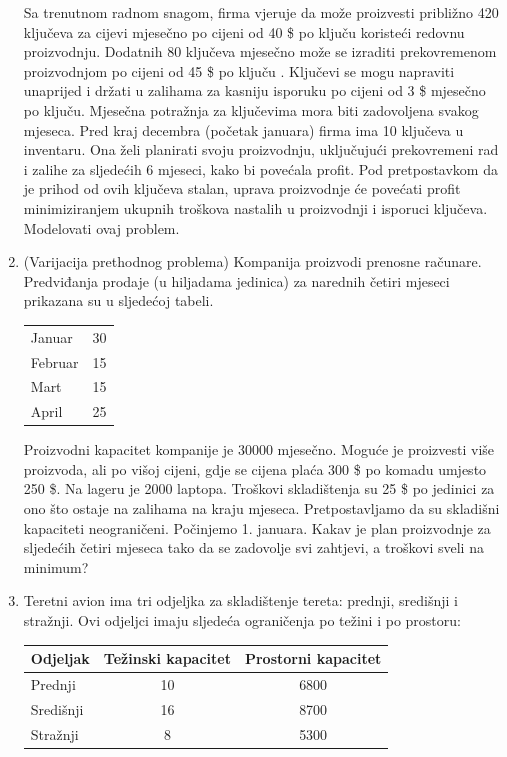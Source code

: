 \documentclass[a4paper, utf8, 11pt, colorlinks]{book}
\begin{document}
\begin{enumerate}
	Sa trenutnom radnom snagom, firma vjeruje da može proizvesti približno 420 ključeva za cijevi mjesečno po cijeni od 40 \$ po ključu koristeći redovnu proizvodnju. Dodatnih 80 ključeva mjesečno može se izraditi prekovremenom proizvodnjom po cijeni od 45 \$ po ključu .
	Ključevi se mogu napraviti unaprijed i držati u zalihama za kasniju isporuku po cijeni od 3 \$ mjesečno po ključu. Mjesečna potražnja za ključevima mora biti zadovoljena svakog mjeseca. Pred kraj decembra (početak januara) firma ima 10 ključeva u inventaru. Ona 
	želi planirati svoju proizvodnju, uključujući prekovremeni rad i zalihe za sljedećih 6 mjeseci, kako bi povećala profit. Pod pretpostavkom da je prihod od ovih ključeva stalan, uprava proizvodnje  će povećati  profit minimiziranjem ukupnih troškova nastalih u proizvodnji i isporuci ključeva. Modelovati ovaj problem.
	\item %
	(Varijacija prethodnog problema) Kompanija proizvodi prenosne računare. Predviđanja prodaje (u hiljadama jedinica) za narednih četiri mjeseci prikazana su u sljedećoj tabeli. 
\begin{center}
	\begin{tabular}{lc}\hline
		Januar  & 30 \\
		Februar & 15 \\
		Mart    & 15 \\
		April   & 25 \\
		\hline
	\end{tabular}  
\end{center}	
	
	Proizvodni kapacitet kompanije je 30000 mjesečno. Moguće je proizvesti više proizvoda, ali po višoj cijeni, gdje se cijena plaća 300 \$ po komadu umjesto 250 \$. Na lageru je 2000 laptopa. Troškovi skladištenja su 25 \$ po jedinici za ono što ostaje na zalihama na kraju mjeseca. Pretpostavljamo da su skladišni kapaciteti neograničeni. Počinjemo 1. januara. Kakav je plan proizvodnje za sljedećih četiri mjeseca tako da se zadovolje svi zahtjevi, a troškovi sveli na minimum?
	\item Teretni avion ima tri odjeljka za skladištenje tereta: prednji, središnji i stražnji. Ovi odjeljci imaju sljedeća ograničenja po težini i po prostoru: 
\begin{table}[!ht]
	\centering
	\begin{tabular}{lcc}
	   Odjeljak   & Težinski kapacitet & Prostorni kapacitet \\ \hline
	   Prednji    & 10                 & 6800                 \\ 
	   Središnji  & 16                 & 8700                 \\
	   Stražnji   &  8                 & 5300                 \\ \hline
 	\end{tabular}
\end{table}
	

\end{enumerate}
\end{document}
